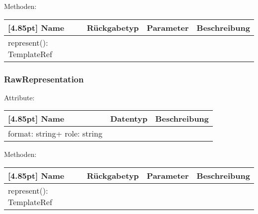                 Methoden:
        		\begin{center}
                \setlength\tabcolsep{5pt}
                	\renewcommand{\arraystretch}{1.5}
                    	\begin{tabularx}{\textwidth}{|l|l|l|X|}
                    	\hline
                    	\rowcolor[gray]{0.75}[4.85pt]
                		Name & Rückgabetyp & Parameter & Beschreibung \\ \hline
                		represent(): TemplateRef
                        & & &  \\ \hline
                        \end{tabularx}
        		\end{center}
        	
        	\subsubsection{RawRepresentation}
        	
        	    Attribute:
                \begin{center}
                	\renewcommand{\arraystretch}{1.5}
                    \setlength\tabcolsep{5pt}
                	\begin{tabularx}{\textwidth}{|l|l|X|}
                		\hline
                        \rowcolor[gray]{0.75}[4.85pt]            		
                        Name & Datentyp & Beschreibung \\ \hline
                        format: string+ role: string
                        & &  \\ \hline
                	\end{tabularx}
                \end{center}
                
                Methoden:
        		\begin{center}
                \setlength\tabcolsep{5pt}
                	\renewcommand{\arraystretch}{1.5}
                    	\begin{tabularx}{\textwidth}{|l|l|l|X|}
                    	\hline
                    	\rowcolor[gray]{0.75}[4.85pt]
                		Name & Rückgabetyp & Parameter & Beschreibung \\ \hline
                		represent(): TemplateRef
                        & & &  \\ \hline
                        \end{tabularx}
        		\end{center}
        	
